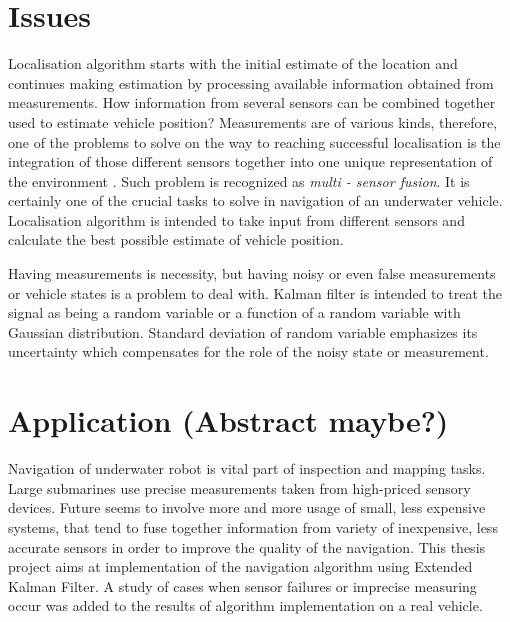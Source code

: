 \section{Issues}
Localisation algorithm starts with the initial estimate of the location and continues making estimation by processing available information obtained from measurements. How information from several sensors can be combined together used to estimate vehicle position? Measurements are of various kinds, therefore, one of the problems to solve on the way to reaching successful localisation is the integration of those different sensors together into one unique representation of the environment \cite{negenborn03}. Such problem is recognized as \textit{multi - sensor fusion}. It is certainly one of the crucial tasks to solve in navigation of an underwater vehicle. Localisation algorithm is intended to take input from different sensors and calculate the best possible estimate of vehicle position. 

Having measurements is necessity, but having noisy or even false measurements or vehicle states is a problem to deal with. Kalman filter is intended to treat the signal as being a random variable or a function of a random variable with Gaussian distribution. Standard deviation of random variable emphasizes its uncertainty which compensates for the role of the noisy state or measurement.

\section{Application (Abstract maybe?)}
Navigation of underwater robot is vital part of inspection and mapping tasks. Large submarines use precise measurements taken from high-priced sensory devices. Future seems to involve more and more usage of small, less expensive systems, that tend to fuse together information from variety of inexpensive, less accurate sensors in order to improve the quality of the navigation. This thesis project aims at implementation of the navigation algorithm using Extended Kalman Filter. A study of cases when sensor failures or imprecise measuring occur was added to the results of algorithm implementation on a real vehicle.